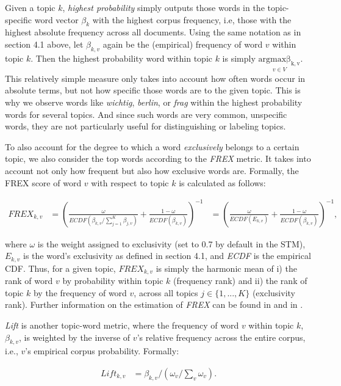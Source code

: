 \documentclass[12pt]{article}
\begin{document}
Given a topic $k$, \textit{highest probability} simply outputs those words in the topic-specific word vector $\beta_{k}$ with the highest corpus frequency, i.e, those with the highest absolute frequency across all documents. Using the same notation as in section 4.1 above, let $\beta_{k,v}$ again be the (empirical) frequency of word $v$ within topic $k$. Then the highest probability word within topic $k$ is simply $\underset{v \in V}{\operatorname{argmax\beta_{k,v}}}$. This relatively simple measure only takes into account how often words occur in absolute terms, but not how specific those words are to the given topic. This is why we observe words like \textit{wichtig}, \textit{berlin}, or \textit{frag} within the highest probability words for several topics. And since such words are very common, unspecific words, they are not particularly useful for distinguishing or labeling topics.

To also account for the degree to which a word \textit{exclusively} belongs to a certain topic, we also consider the top words according to the \textit{FREX} metric. It takes into account not only how frequent but also how exclusive words are. Formally, the FREX score of word $v$ with respect to topic $k$ is calculated as follows:

\begin{align*}
FREX_{k,v} &= (\frac{\omega}{ECDF(\beta_{k,v}/\sum_{j=1}^{K}\beta_{j,v})} + \frac{1-\omega}{ECDF(\beta_{k,v})})^{-1} &= (\frac{\omega}{ECDF(E_{k,v})} + \frac{1-\omega}{ECDF(\beta_{k,v})})^{-1},
\end{align*}

where $\omega$ is the weight  assigned to exclusivity (set to 0.7 by default in the STM), $E_{k,v}$ is the word's exclusivity as defined in section 4.1, and \textit{ECDF} is the empirical CDF. Thus, for a given topic, $FREX_{k,v}$ is simply the harmonic mean of i) the rank of word $v$ by probability within topic $k$ (frequency rank) and ii) the rank of topic $k$ by the frequency of word $v$, across all topics $j \in \{1,...,K\}$ (exclusivity rank). Further information on the estimation of \textit{FREX} can be found in \cite{stm} and in \cite{bischof2012summarizing}.

\textit{Lift} is another topic-word metric, where the frequency of word $v$ within topic $k$,  $\beta_{k,v}$, is weighted by the inverse of $v$'s relative frequency across the entire corpus, i.e., $v$'s empirical corpus probability. Formally:

\begin{align*}
Lift_{k,v} &= \beta_{k,v}/(\omega_{v}/\sum_{v}\omega_{v}).
\end{align*}
\end{document}
